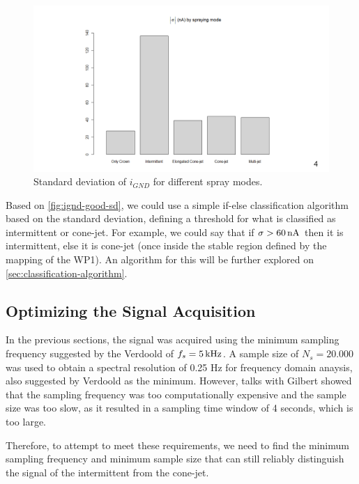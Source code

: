 \documentclass[oneside,12pt]{article}
\begin{document}
\begin{figure}[h!]
    \centering
    \includegraphics[width=1\textwidth,trim=1 1 1 1,clip]{figures/ignd-good-sd.png}
    \caption{Standard deviation of $i_{GND}$ for different spray modes.}
    \label{fig:ignd-good-sd}
\end{figure}

Based on \autoref{fig:ignd-good-sd}, we could use a simple if-else classification algorithm based on the standard deviation, 
defining a threshold for what is classified as intermittent or cone-jet. For example, we could say that if $\sigma > 60 \,\mathrm{nA}$
then it is intermittent, else it is cone-jet (once inside the stable region defined by the mapping of the WP1).
An algorithm for this will be further explored on \autoref{sec:classification-algorithm}.


\subsection{Optimizing the Signal Acquisition}

In the previous sections, the signal was acquired using the minimum sampling frequency
suggested by the Verdoold of $f_s = 5 \,\mathrm{kHz}$. A sample size of $N_s = 20.000$ was used to obtain a spectral resolution of 0.25 Hz
for frequency domain anaysis, also suggested by Verdoold as the minimum. However, talks with Gilbert showed that the sampling frequency was too
computationally expensive and the sample size was too slow, as it resulted in a sampling time window of 4 seconds, which is too large.

Therefore, to attempt to meet these requirements, we need to find the minimum sampling frequency and
minimum sample size that can still reliably distinguish the signal of the intermittent from the cone-jet.
\end{document}
